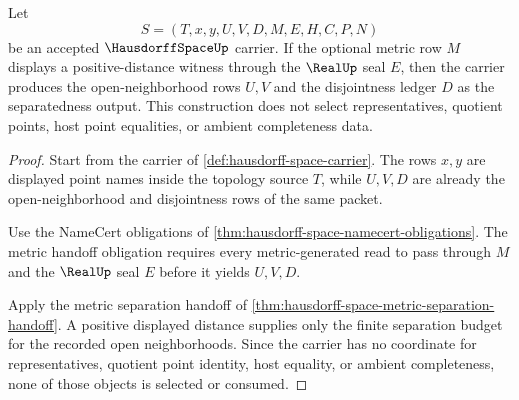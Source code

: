 \begin{theorem}
\label{thm:hausdorff-space-point-separation-choicefree}
Let
$$
S=(T,x,y,U,V,D,M,E,H,C,P,N)
$$
be an accepted $\HausdorffSpaceUp$ carrier. If the optional metric row $M$ displays a positive-distance witness through the $\RealUp$ seal $E$, then the carrier produces the open-neighborhood rows $U,V$ and the disjointness ledger $D$ as the separatedness output. This construction does not select representatives, quotient points, host point equalities, or ambient completeness data.
\end{theorem}
\begin{proof}
Start from the carrier of \autoref{def:hausdorff-space-carrier}. The rows $x,y$ are displayed point names inside the topology source $T$, while $U,V,D$ are already the open-neighborhood and disjointness rows of the same packet.

Use the NameCert obligations of \autoref{thm:hausdorff-space-namecert-obligations}. The metric handoff obligation requires every metric-generated read to pass through $M$ and the $\RealUp$ seal $E$ before it yields $U,V,D$.

Apply the metric separation handoff of \autoref{thm:hausdorff-space-metric-separation-handoff}. A positive displayed distance supplies only the finite separation budget for the recorded open neighborhoods. Since the carrier has no coordinate for representatives, quotient point identity, host equality, or ambient completeness, none of those objects is selected or consumed.
\end{proof}

